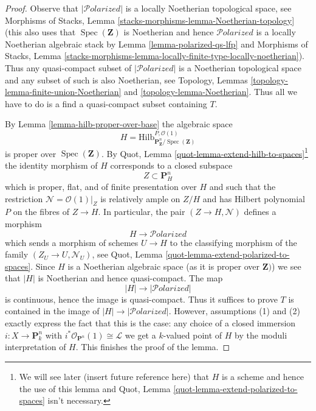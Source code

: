 \documentclass{stacks-project}
\theoremstyle{plain}
\theoremstyle{definition}
\theoremstyle{remark}
\numberwithin{equation}{subsection}
\def\Spec{\mathop{\mathrm{Spec}}}
\def\Hilbfunctor{\mathrm{Hilb}}
\def\Polarizedstack{\mathcal{P}\!\mathit{olarized}}
\begin{document}
\begin{proof}
Observe that $|\Polarizedstack|$ is a locally Noetherian topological
space, see Morphisms of Stacks, Lemma
\ref{stacks-morphisms-lemma-Noetherian-topology}
(this also uses that $\Spec(\mathbf{Z})$ is Noetherian and
hence $\Polarizedstack$ is a locally Noetherian algebraic stack
by Lemma \ref{lemma-polarized-qs-lfp} and
Morphisms of Stacks, Lemma
\ref{stacks-morphisms-lemma-locally-finite-type-locally-noetherian}).
Thus any quasi-compact subset of $|\Polarizedstack|$ is
a Noetherian topological space and any subset of such is
also Noetherian, see
Topology, Lemmas \ref{topology-lemma-finite-union-Noetherian} and
\ref{topology-lemma-Noetherian}.
Thus all we have to do is a find a quasi-compact subset
containing $T$.

\medskip\noindent
By Lemma \ref{lemma-hilb-proper-over-base} the algebraic space
$$
H =
\Hilbfunctor^{P, \mathcal{O}(1)}_{\mathbf{P}^n_\mathbf{Z}/\Spec(\mathbf{Z})}
$$
is proper over $\Spec(\mathbf{Z})$. By
Quot, Lemma \ref{quot-lemma-extend-hilb-to-spaces}\footnote{We will see
later (insert future reference here) that $H$ is a scheme and hence the
use of this lemma and Quot, Lemma \ref{quot-lemma-extend-polarized-to-spaces}
isn't necessary.} the identity morphism of $H$ corresponds
to a closed subspace
$$
Z \subset \mathbf{P}^n_H
$$
which is proper, flat, and of finite presentation over $H$ and
such that the restriction $\mathcal{N} = \mathcal{O}(1)|_Z$
is relatively ample on $Z/H$ and has Hilbert polynomial $P$
on the fibres of $Z \to H$. In particular, the pair $(Z \to H, \mathcal{N})$
defines a morphism
$$
H \longrightarrow \Polarizedstack
$$
which sends a morphism of schemes $U \to H$ to the classifying morphism
of the family $(Z_U \to U, \mathcal{N}_U)$, see
Quot, Lemma \ref{quot-lemma-extend-polarized-to-spaces}.
Since $H$ is a Noetherian algebraic space
(as it is proper over $\mathbf{Z})$)
we see that $|H|$ is Noetherian and hence quasi-compact. The map
$$
|H| \longrightarrow |\Polarizedstack|
$$
is continuous, hence the image is quasi-compact.
Thus it suffices to prove $T$ is contained
in the image of $|H| \to |\Polarizedstack|$.
However, assumptions (1) and (2) exactly express the fact
that this is the case: any choice of a closed immersion
$i : X \to \mathbf{P}^n_k$ with
$i^*\mathcal{O}_{\mathbf{P}^n}(1) \cong \mathcal{L}$ we get a
$k$-valued point of $H$ by the moduli interpretation of $H$.
This finishes the proof of the lemma.
\end{proof}
\end{document}
